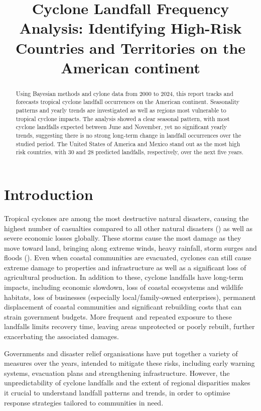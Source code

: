 \documentclass[
]{article}
\title{Cyclone Landfall Frequency Analysis: Identifying High-Risk Countries and Territories on the American continent}
\author{}
\date{\vspace{-2.5em}}
\begin{document}
\maketitle
\begin{abstract}
Using Bayesian methods and cylone data from 2000 to 2024, this report tracks and forecasts tropical cyclone landfall occurrences on the American continent. Seasonality patterns and yearly trends are investigated as well as regions most vulnerable to tropical cyclone impacts. The analysis showed a clear seasonal pattern, with most cyclone landfalls expected between June and November, yet no significant yearly trends, suggesting there is no strong long-term change in landfall occurrences over the studied period. The United States of America and Mexico stand out as the most high risk countries, with 30 and 28 predicted landfalls, respectively, over the next five years.
\end{abstract}

{
\setcounter{tocdepth}{2}
\tableofcontents
}
\section{Introduction}\label{introduction}

Tropical cyclones are among the most destructive natural disasters, causing the highest number of casualties compared to all other natural disasters () as well as severe economic losses globally. These storms cause the most damage as they move toward land, bringing along extreme winds, heavy rainfall, storm surges and floods (). Even when coastal communities are evacuated, cyclones can still cause extreme damage to properties and infrastructure as well as a significant loss of agricultural production. In addition to these, cyclone landfalls have long-term impacts, including economic slowdown, loss of coastal ecosystems and wildlife habitats, loss of businesses (especially local/family-owned enterprises), permanent displacement of coastal communities and significant rebuilding costs that can strain government budgets. More frequent and repeated exposure to these landfalls limits recovery time, leaving areas unprotected or poorly rebuilt, further exacerbating the associated damages.

Governments and disaster relief organisations have put together a variety of measures over the years, intended to mitigate these risks, including early warning systems, evacuation plans and strengthening infrastructure. However, the unpredictability of cyclone landfalls and the extent of regional disparities makes it crucial to understand landfall patterns and trends, in order to optimise response strategies tailored to communities in need.
\end{document}
